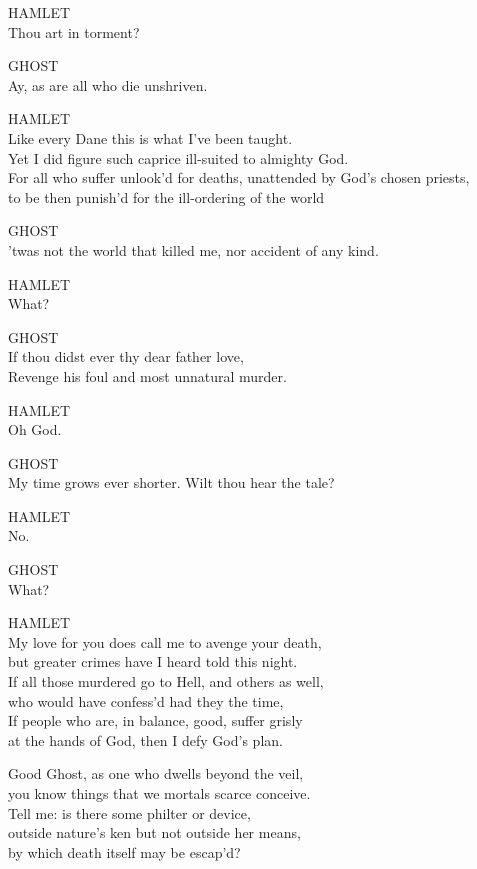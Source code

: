 \bigskip
\noindent{}HAMLET\\
Thou art in torment?

\bigskip
\noindent{}GHOST\\
Ay, as are all who die unshriven.

\bigskip
\noindent{}HAMLET\\
Like every Dane this is what I've been taught.\\
Yet I did figure such caprice ill-suited to almighty God.\\
For all who suffer unlook'd for deaths, unattended by God's chosen priests,\\
to be then punish'd for the ill-ordering of the world{\el}

\bigskip
\noindent{}GHOST\\
'twas not the world that killed me, nor accident of any kind.

\bigskip
\noindent{}HAMLET\\
What?

\bigskip
\noindent{}GHOST\\
If thou didst ever thy dear father love,\\
Revenge his foul and most unnatural murder.

\bigskip
\noindent{}HAMLET\\
Oh God.

\bigskip
\noindent{}GHOST\\
My time grows ever shorter. Wilt thou hear the tale?

\bigskip
\noindent{}HAMLET\\
No.

\bigskip
\noindent{}GHOST\\
What?

\bigskip
\noindent{}HAMLET\\
My love for you does call me to avenge your death,\\
but greater crimes have I heard told this night.\\
If all those murdered go to Hell, and others as well,\\
who would have confess'd had they the time,\\
If people who are, in balance, good, suffer grisly\\
at the hands of God, then I defy God's plan.

\bigskip
\noindent{}Good Ghost, as one who dwells beyond the veil,\\
you know things that we mortals scarce conceive.\\
Tell me: is there some philter or device,\\
outside nature's ken but not outside her means,\\
by which death itself may be escap'd?

